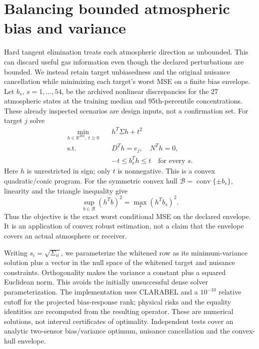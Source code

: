 \section{Balancing bounded atmospheric bias and variance}
Hard tangent elimination treats each atmospheric direction as unbounded. This can discard useful gas information even though the declared perturbations are bounded. We instead retain target unbiasedness and the original nuisance cancellation while minimizing each target's worst MSE on a finite bias envelope. Let $b_s$, $s=1,\ldots,54$, be the archived nonlinear discrepancies for the 27 atmospheric states at the training median and 95th-percentile concentrations. These already inspected scenarios are design inputs, not a confirmation set. For target $j$ solve
\begin{equation}
\begin{aligned}
\min_{h\in\mathbb R^{202},\;t\geq0}\quad & h^T\Sigma h+t^2\\
\text{s.t.}\quad&D^Th=e_j,\quad N^Th=0,\\
&-t\leq b_s^Th\leq t\quad\text{for every }s.
\end{aligned}
\label{eq:boundedbias}
\end{equation}
Here $h$ is unrestricted in sign; only $t$ is nonnegative. This is a convex quadratic/conic program. For the symmetric convex hull $\mathcal B=\operatorname{conv}\{\pm b_s\}$, linearity and the triangle inequality give
\[
\sup_{b\in\mathcal B}(h^Tb)^2=\max_s(h^Tb_s)^2.
\]
Thus the objective is the exact worst conditional MSE on the declared envelope. It is an application of convex robust estimation, not a claim that the envelope covers an actual atmosphere or receiver.

Writing $s_i=\sqrt{\Sigma_{ii}}$, we parameterize the whitened row as its minimum-variance solution plus a vector in the null space of the whitened target and nuisance constraints. Orthogonality makes the variance a constant plus a squared Euclidean norm. This avoids the initially unsuccessful dense solver parameterization. The implementation uses CLARABEL and a $10^{-10}$ relative cutoff for the projected bias-response rank; physical risks and the equality identities are recomputed from the resulting operator. These are numerical solutions, not interval certificates of optimality. Independent tests cover an analytic two-sensor bias/variance optimum, nuisance cancellation and the convex-hull envelope.

